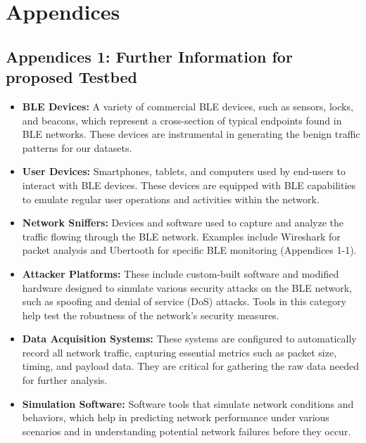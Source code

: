 \section*{Appendices}\parskip=-1mm

\vspace{8pt}

\subsection{Appendices 1: Further Information for proposed Testbed}

\vspace{8pt}

\begin{itemize}[leftmargin=0.1cm]
    \item \textbf{BLE Devices:} A variety of commercial BLE devices, such as sensors, locks, and beacons, which represent a cross-section of typical endpoints found in BLE networks. These devices are instrumental in generating the benign traffic patterns for our datasets.
    \item \textbf{User Devices:} Smartphones, tablets, and computers used by end-users to interact with BLE devices. These devices are equipped with BLE capabilities to emulate regular user operations and activities within the network.
    \item \textbf{Network Sniffers:} Devices and software used to capture and analyze the traffic flowing through the BLE network. Examples include Wireshark for packet analysis and Ubertooth for specific BLE monitoring (Appendices 1-1).
    \item \textbf{Attacker Platforms:} These include custom-built software and modified hardware designed to simulate various security attacks on the BLE network, such as spoofing and denial of service (DoS) attacks. Tools in this category help test the robustness of the network's security measures.
    \item \textbf{Data Acquisition Systems:} These systems are configured to automatically record all network traffic, capturing essential metrics such as packet size, timing, and payload data. They are critical for gathering the raw data needed for further analysis.
    \item \textbf{Simulation Software:} Software tools that simulate network conditions and behaviors, which help in predicting network performance under various scenarios and in understanding potential network failures before they occur.
\end{itemize}

